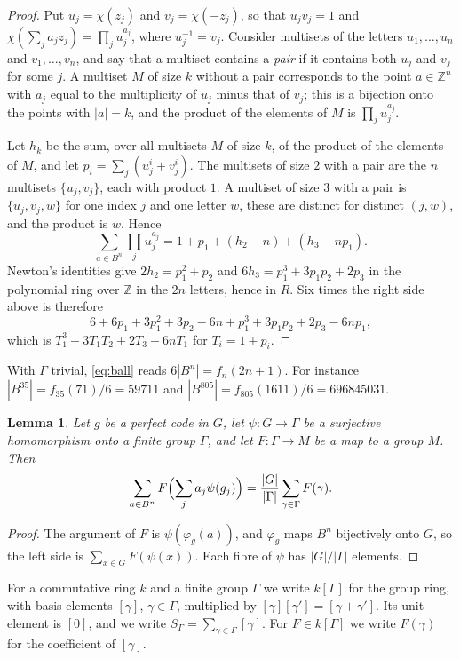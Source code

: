 \documentclass{amsart}
\newtheorem{lemma}[theorem]{Lemma}
\theoremstyle{definition}
\theoremstyle{remark}
\numberwithin{equation}{section}
\newcommand{\Z}{\mathbb{Z}}
\newcommand{\gp}[1]{[#1]}
\begin{document}
\begin{proof}
Put $u_j=\chi(z_j)$ and $v_j=\chi(-z_j)$, so that $u_jv_j=1$ and $\chi(\sum_ja_jz_j)=\prod_ju_j^{a_j}$, where $u_j^{-1}=v_j$. Consider multisets of the letters $u_1,\dots,u_n$ and $v_1,\dots,v_n$, and say that a multiset contains a \emph{pair} if it contains both $u_j$ and $v_j$ for some $j$. A multiset $M$ of size $k$ without a pair corresponds to the point $a\in\Z^n$ with $a_j$ equal to the multiplicity of $u_j$ minus that of $v_j$; this is a bijection onto the points with $|a|=k$, and the product of the elements of $M$ is $\prod_ju_j^{a_j}$.

Let $h_k$ be the sum, over all multisets $M$ of size $k$, of the product of the elements of $M$, and let $p_i=\sum_j(u_j^i+v_j^i)$. The multisets of size $2$ with a pair are the $n$ multisets $\{u_j,v_j\}$, each with product $1$. A multiset of size $3$ with a pair is $\{u_j,v_j,w\}$ for one index $j$ and one letter $w$, these are distinct for distinct $(j,w)$, and the product is $w$. Hence
\[
\sum_{a\in B^n}\prod_ju_j^{a_j}=1+p_1+(h_2-n)+(h_3-np_1).
\]
Newton's identities give $2h_2=p_1^2+p_2$ and $6h_3=p_1^3+3p_1p_2+2p_3$ in the polynomial ring over $\Z$ in the $2n$ letters, hence in $R$. Six times the right side above is therefore
\[
6+6p_1+3p_1^2+3p_2-6n+p_1^3+3p_1p_2+2p_3-6np_1,
\]
which is $T_1^3+3T_1T_2+2T_3-6nT_1$ for $T_i=1+p_i$.
\end{proof}

With $\Gamma$ trivial, \eqref{eq:ball} reads $6|B^n|=f_n(2n+1)$. For instance $|B^{35}|=f_{35}(71)/6=59711$ and $|B^{805}|=f_{805}(1611)/6=696845031$.

\begin{lemma}\label{lem:uniform}
Let $g$ be a perfect code in $G$, let $\psi\colon G\to\Gamma$ be a surjective homomorphism onto a finite group $\Gamma$, and let $F\colon\Gamma\to M$ be a map to a group $M$. Then
\[
\sum_{a\in B^n}F\Bigl(\sum_ja_j\psi(g_j)\Bigr)=\frac{|G|}{|\Gamma|}\sum_{\gamma\in\Gamma}F(\gamma).
\]
\end{lemma}

\begin{proof}
The argument of $F$ is $\psi(\varphi_g(a))$, and $\varphi_g$ maps $B^n$ bijectively onto $G$, so the left side is $\sum_{x\in G}F(\psi(x))$. Each fibre of $\psi$ has $|G|/|\Gamma|$ elements.
\end{proof}

For a commutative ring $k$ and a finite group $\Gamma$ we write $k[\Gamma]$ for the group ring, with basis elements $\gp{\gamma}$, $\gamma\in\Gamma$, multiplied by $\gp{\gamma}\gp{\gamma'}=\gp{\gamma+\gamma'}$. Its unit element is $\gp0$, and we write $S_\Gamma=\sum_{\gamma\in\Gamma}\gp{\gamma}$. For $F\in k[\Gamma]$ we write $F(\gamma)$ for the coefficient of $\gp{\gamma}$.
\end{document}
